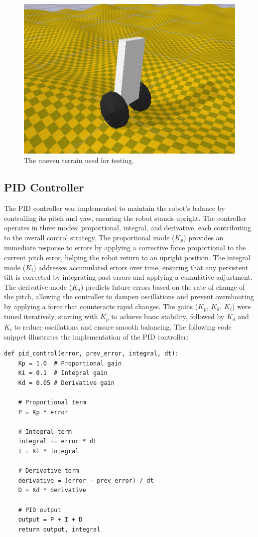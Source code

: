 \documentclass[12pt, draftclsnofoot, onecolumn]{IEEEtran}
\begin{document}
\begin{figure}[h]
\begin{minipage}{0.65\textwidth}
        \includegraphics[width=\textwidth]{terrain.png}
        \caption{The uneven terrain used for testing.}
        \label{fig:uneven_terrain}
    \end{minipage}
\end{figure}


\subsection{PID Controller}
The PID controller was implemented to maintain the robot's balance by controlling its pitch and yaw, ensuring the robot stands upright. The controller operates in three modes: proportional, integral, and derivative, each contributing to the overall control strategy. The proportional mode ($K_p$) provides an immediate response to errors by applying a corrective force proportional to the current pitch error, helping the robot return to an upright position. The integral mode ($K_i$) addresses accumulated errors over time, ensuring that any persistent tilt is corrected by integrating past errors and applying a cumulative adjustment. The derivative mode ($K_d$) predicts future errors based on the rate of change of the pitch, allowing the controller to dampen oscillations and prevent overshooting by applying a force that counteracts rapid changes. The gains ($K_p$, $K_d$, $K_i$) were tuned iteratively, starting with $K_p$ to achieve basic stability, followed by $K_d$ and $K_i$ to reduce oscillations and ensure smooth balancing. The following code snippet illustrates the implementation of the PID controller:

\begin{verbatim}
def pid_control(error, prev_error, integral, dt):
    Kp = 1.0  # Proportional gain
    Ki = 0.1  # Integral gain
    Kd = 0.05 # Derivative gain

    # Proportional term
    P = Kp * error

    # Integral term
    integral += error * dt
    I = Ki * integral

    # Derivative term
    derivative = (error - prev_error) / dt
    D = Kd * derivative

    # PID output
    output = P + I + D
    return output, integral
\end{verbatim}
\end{document}
